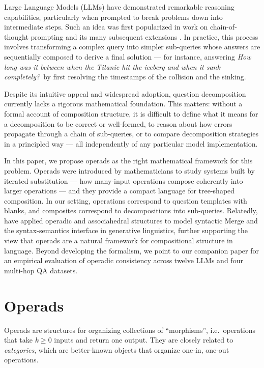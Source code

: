 \documentclass{article}
\theoremstyle{plain}
\theoremstyle{definition}
\theoremstyle{remark}
\theoremstyle{definition}
\begin{document}
Large Language Models (LLMs) have demonstrated remarkable reasoning capabilities, particularly when prompted to break problems down into intermediate steps.
Such an idea was first popularized in work on chain-of-thought prompting \citep{wei2022chain} and its many subsequent extensions \citep{yao2023tree, khot2022decomposed, wang2022self, yang2024buffer, 
besta2024graph}.
In practice, this process involves transforming a complex query into simpler sub-queries whose answers are sequentially composed to derive a final solution --- for instance, answering \emph{How long was it between when the Titanic hit the iceberg and when it sank completely?}\ by first resolving the timestamps of the collision and the sinking.

Despite its intuitive appeal and widespread adoption, question decomposition currently lacks a rigorous mathematical foundation.
This matters: without a formal account of composition structure, it is difficult to define what it means for a decomposition to be correct or well-formed, to reason about how errors propagate through 
a chain of sub-queries, or to compare decomposition strategies in a principled way --- all independently of any particular model implementation.

In this paper, we propose operads as the right mathematical framework for this problem.
Operads were introduced by mathematicians to study systems built by iterated substitution --- how many-input operations compose coherently into larger operations --- and they provide a compact language for tree-shaped composition.
In our setting, operations correspond to question templates with blanks, and composites correspond to decompositions into sub-queries.
Relatedly, \citet{marcolli2023syntax} have applied operadic and associahedral structures to model syntactic Merge and the syntax-semantics interface in generative linguistics, further supporting the view that operads are a natural framework for compositional structure in language.
Beyond developing the formalism, we point to our companion paper \citep{bottman:operadic_consistency_empirical} for an empirical evaluation of operadic consistency across twelve LLMs and four multi-hop QA datasets.

\section{Operads}
\label{s:operads}

Operads are structures for organizing collections of ``morphisms'', i.e.\ operations that take $k\geq0$ inputs and return one output.
They are closely related to \emph{categories}, which are better-known objects that organize one-in, one-out operations.
\end{document}
